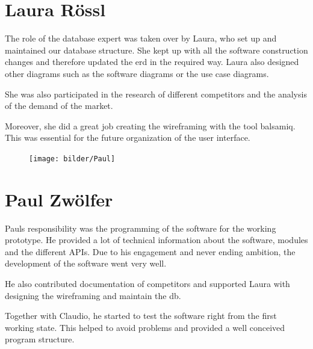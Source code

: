 \section*{Laura Rössl}
The role of the database expert was taken over by Laura, who set up and maintained our database structure. She kept up with all the software construction changes and therefore updated the \gls{erd} in the required way. Laura also designed other diagrams such as the software diagrams or the use case diagrams. 

She was also participated in the research of different competitors and the analysis of the demand of the market.

Moreover, she did a great job creating the wireframing with the tool balsamiq. This was essential for the future organization of the user interface.
\begin{figure}
	\texttt{[image: bilder/Paul]}
\end{figure}
\section*{Paul Zwölfer}
Pauls responsibility was the programming of the software for the working prototype. He provided a lot of technical information about the software, modules and the different APIs. Due to his engagement and never ending ambition, the development of the software went very well.

He also contributed documentation of competitors and supported Laura with designing the wireframing and maintain the \gls{db}.

Together with Claudio, he started to test the software right from the first working state. This helped to avoid problems and provided a well conceived program structure.
